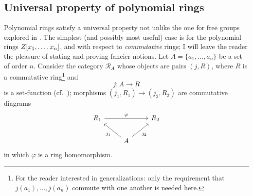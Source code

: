 \subsection{Universal property of polynomial rings}
\label{subsec:rings:universal-property-of-polynomial-rings}
Polynomial rings satisfy a universal property not unlike the one for
free groups explored in
. The simplest (and possibly
most useful) case is for the polynomial rings $Z[x_1, \ldots, x_n]$,
and with respect to \emph{commutative} rings; I will leave the reader
the pleasure of stating and proving fancier notions.  Let
$A = \{a_1, \ldots, a_n\}$ be a set of order $n$. Consider the
category $\mathscr{R}_A$ whose objects are pairs $(j, R)$, where $R$
is a commutative ring\footnote{For the reader interested in
  generalizations: only the requirement that $j(a_1), \ldots, j(a_n)$
  commute with one another is needed here.} and
\[
  j : A \to R
\]
is a set-function (cf.\ );
morphisms $(j_1, R_1) \to (j_2, R_2)$ are commutative diagrams
\[
  \begin{tikzcd}
    R_1 \arrow[rr, "\varphi"] & & R_2 \\
    & A \arrow[ul, "j_1"] \arrow[ur, "j_2"']
  \end{tikzcd}
\]
in which $\varphi$ is a ring homomorphism.

